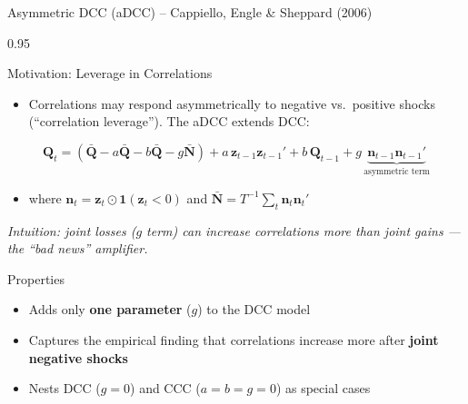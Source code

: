 \documentclass[9pt, aspectratio=169, t]{beamer}
\begin{document}
\begin{frame}{Asymmetric DCC (aDCC) -- Cappiello, Engle \& Sheppard (2006)}
    \begin{cminipage}{0.95\textwidth}
    {\footnotesize
    \begin{block}{Motivation: Leverage in Correlations}
        \begin{itemize}\setlength{\itemsep}{0pt}
            \item Correlations may respond asymmetrically to negative vs.\ positive shocks (``correlation leverage''). The aDCC extends DCC:
        \end{itemize}
        \[
            \mathbf{Q}_t = (\bar{\mathbf{Q}} - a\bar{\mathbf{Q}} - b\bar{\mathbf{Q}} - g\bar{\mathbf{N}}) + a\,\mathbf{z}_{t-1}\mathbf{z}_{t-1}' + b\,\mathbf{Q}_{t-1} + g\,\underbrace{\mathbf{n}_{t-1}\mathbf{n}_{t-1}'}_{\text{asymmetric term}}
        \]
        \begin{itemize}\setlength{\itemsep}{0pt}
            \item where $\mathbf{n}_t = \mathbf{z}_t \odot \mathbf{1}(\mathbf{z}_t < 0)$ and $\bar{\mathbf{N}} = T^{-1}\sum_t \mathbf{n}_t\mathbf{n}_t'$
        \end{itemize}
        \textit{Intuition: joint losses ($g$ term) can increase correlations more than joint gains --- the ``bad news'' amplifier.}
    \end{block}
    \vspace{0.1cm}
    \begin{block}{Properties}
        \begin{itemize}\setlength{\itemsep}{0pt}
            \item Adds only \textbf{one parameter} ($g$) to the DCC model
            \item Captures the empirical finding that correlations increase more after \textbf{joint negative shocks}
            \item Nests DCC ($g=0$) and CCC ($a=b=g=0$) as special cases
        \end{itemize}
    \end{block}
    }
    \end{cminipage}
\end{frame}
\end{document}
